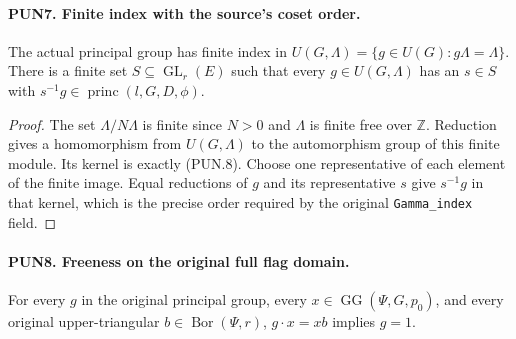 \paragraph{PUN7. Finite index with the source's coset order.}
\label{claim:PUN7}
The actual principal group has finite index in
\(U(G,\Lambda)=\{g\in U(G):g\Lambda=\Lambda\}\).
There is a finite set \(S\subseteq\operatorname{GL}_r(E)\)
such that every \(g\in U(G,\Lambda)\) has an \(s\in S\) with
\(s^{-1}g\in\operatorname{princ}(l,G,D,\phi)\).

\begin{proof}
The set \(\Lambda/N\Lambda\) is finite since \(N>0\) and
\(\Lambda\) is finite free over \(\mathbb Z\).  Reduction gives
a homomorphism from \(U(G,\Lambda)\) to the automorphism group
of this finite module.  Its kernel is exactly (PUN.8).  Choose
one representative of each element of the finite image.  Equal
reductions of \(g\) and its representative \(s\) give
\(s^{-1}g\) in that kernel, which is the precise order required
by the original \texttt{Gamma\_index} field.
\end{proof}

\paragraph{PUN8. Freeness on the original full flag domain.}
\label{claim:PUN8}
For every \(g\) in the original principal group, every
\(x\in\operatorname{GG}(\Psi,G,p_0)\), and every original
upper-triangular \(b\in\operatorname{Bor}(\Psi,r)\),
\(g\cdot x=x b\) implies \(g=1\).

